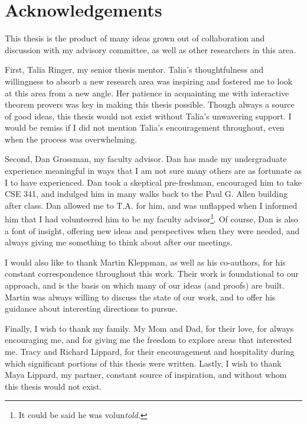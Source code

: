 \chapter*{Acknowledgements}

This thesis is the product of many ideas grown out of collaboration and
discussion with my advisory committee, as well as other researchers in this
area.

First, Talia Ringer, my senior thesis mentor. Talia's thoughtfulness and
willingness to absorb a new research area was inspiring and fostered me to
look at this area from a new angle. Her patience in acquainting me with
interactive theorem provers was key in making this thesis possible. Though
always a source of good ideas, this thesis would not exist without Talia's
unwavering support. I would be remiss if I did not mention Talia's encouragement
throughout, even when the process was overwhelming.

Second, Dan Grossman, my faculty advisor. Dan has made my undergraduate
experience meaningful in ways that I am not sure many others are as fortunate as
I to have experienced. Dan took a skeptical pre-freshman, encouraged him to take
CSE 341, and indulged him in many walks back to the Paul G. Allen building after
class. Dan allowed me to T.A. for him, and was unflapped when I informed him
that I had volunteered him to be my faculty advisor\footnote{It could be said he
was volun\textit{told}.}. Of course, Dan is also a font of insight, offering new
ideas and perspectives when they were needed, and always giving me something to
think about after our meetings.

I would also like to thank Martin Kleppman, as well as his co-authors, for his
constant correspondence throughout this work. Their work is foundational to our
approach, and is the basis on which many of our ideas (and proofs) are built.
Martin was always willing to discuss the state of our work, and to offer his
guidance about interesting directions to pursue.

Finally, I wish to thank my family. My Mom and Dad, for their love, for always
encouraging me, and for giving me the freedom to explore areas that interested
me. Tracy and Richard Lippard, for their encouragement and hospitality during
which significant portions of this thesis were written. Lastly, I wish to thank
Maya Lippard, my partner, constant source of inspiration, and without whom this
thesis would not exist.

